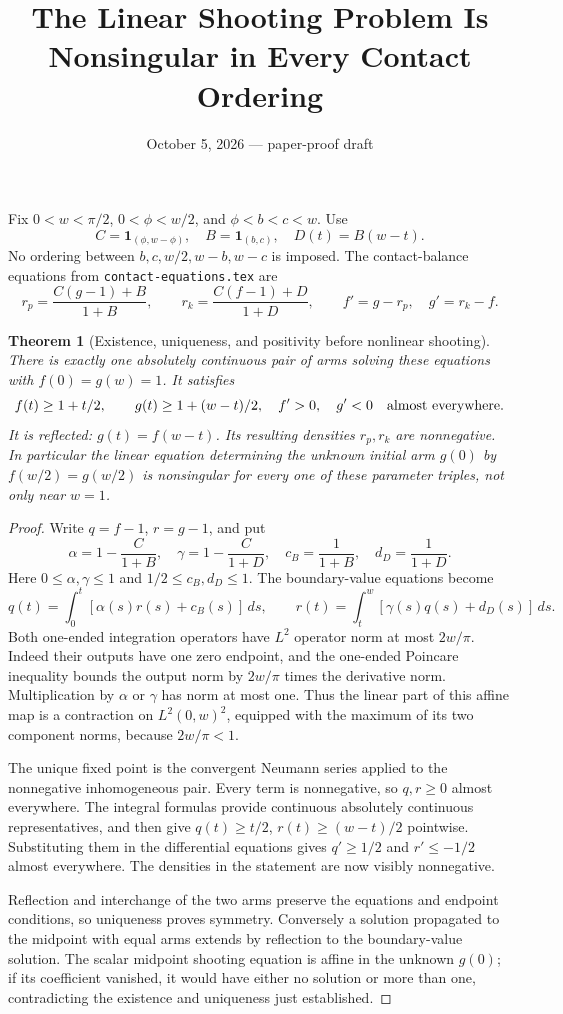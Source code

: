 \documentclass[11pt]{article}
\title{The Linear Shooting Problem Is Nonsingular in Every Contact Ordering}
\author{}\date{October 5, 2026 --- paper-proof draft}
\newtheorem{theorem}{Theorem}
\begin{document}
\maketitle
Fix $0<w<\pi/2$, $0<\phi<w/2$, and $\phi<b<c<w$. Use
\[
 C=\mathbf1_{(\phi,w-\phi)},\quad B=\mathbf1_{(b,c)},\quad D(t)=B(w-t).
\]
No ordering between $b,c,w/2,w-b,w-c$ is imposed. The contact-balance equations from \texttt{contact-equations.tex} are
\[
 r_p=\frac{C(g-1)+B}{1+B},\qquad r_k=\frac{C(f-1)+D}{1+D},
 \qquad f'=g-r_p,\quad g'=r_k-f.
\]

\begin{theorem}[Existence, uniqueness, and positivity before nonlinear shooting]
There is exactly one absolutely continuous pair of arms solving these equations with $f(0)=g(w)=1$. It satisfies
\[
 f(t)\ge1+t/2,\qquad g(t)\ge1+(w-t)/2,
 \quad f'>0,\quad g'<0\quad\hbox{almost everywhere}.
\]
It is reflected: $g(t)=f(w-t)$. Its resulting densities $r_p,r_k$ are nonnegative. In particular the linear equation determining the unknown initial arm $g(0)$ by $f(w/2)=g(w/2)$ is nonsingular for every one of these parameter triples, not only near $w=1$.
\end{theorem}
\begin{proof}
Write $q=f-1$, $r=g-1$, and put
\[
 \alpha=1-\frac{C}{1+B},\quad\gamma=1-\frac{C}{1+D},\quad
 c_B=\frac1{1+B},\quad d_D=\frac1{1+D}.
\]
Here $0\le\alpha,\gamma\le1$ and $1/2\le c_B,d_D\le1$. The boundary-value equations become
\[
 q(t)=\int_0^t[\alpha(s)r(s)+c_B(s)]\,ds,\qquad
 r(t)=\int_t^w[\gamma(s)q(s)+d_D(s)]\,ds.
\]
Both one-ended integration operators have $L^2$ operator norm at most $2w/\pi$. Indeed their outputs have one zero endpoint, and the one-ended Poincare inequality bounds the output norm by $2w/\pi$ times the derivative norm. Multiplication by $\alpha$ or $\gamma$ has norm at most one. Thus the linear part of this affine map is a contraction on $L^2(0,w)^2$, equipped with the maximum of its two component norms, because $2w/\pi<1$.

The unique fixed point is the convergent Neumann series applied to the nonnegative inhomogeneous pair. Every term is nonnegative, so $q,r\ge0$ almost everywhere. The integral formulas provide continuous absolutely continuous representatives, and then give $q(t)\ge t/2$, $r(t)\ge(w-t)/2$ pointwise. Substituting them in the differential equations gives $q'\ge1/2$ and $r'\le-1/2$ almost everywhere. The densities in the statement are now visibly nonnegative.

Reflection and interchange of the two arms preserve the equations and endpoint conditions, so uniqueness proves symmetry. Conversely a solution propagated to the midpoint with equal arms extends by reflection to the boundary-value solution. The scalar midpoint shooting equation is affine in the unknown $g(0)$; if its coefficient vanished, it would have either no solution or more than one, contradicting the existence and uniqueness just established.
\end{proof}
\end{document}

